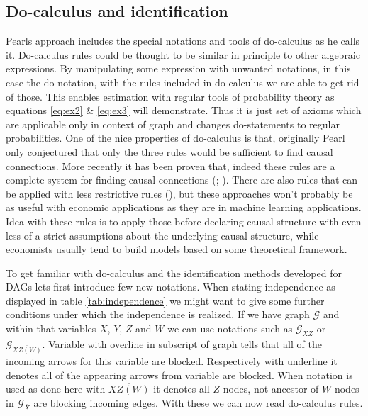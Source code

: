 \documentclass[main=english,12pt,a4paper,pdftex,econ,utf8]{aaltothesis}
\newcommand{\g}{\mathcal{G}}
\begin{document}


\subsection{Do-calculus and identification}

Pearls approach includes the special notations and tools of do-calculus as he calls it. Do-calculus rules could be thought to be similar in principle to other algebraic expressions. By manipulating some expression with unwanted notations, in this case the do-notation, with the rules included in do-calculus we are able to get rid of those. This enables estimation with regular tools of probability theory as equations \ref{eq:ex2} \& \ref{eq:ex3} will demonstrate. Thus it is just set of axioms which are applicable only in context of graph and changes do-statements to regular probabilities. One of the nice properties of do-calculus is that, originally Pearl only conjectured that only the three rules would be sufficient to find causal connections. More recently it has been proven that, indeed these rules are a complete system for finding causal connections (\cite{Shpitser2006}; \cite{Huang2006a}). There are also rules that can be applied with less restrictive rules (\cite{Hyttinen2015}), but these approaches won't probably be as useful with economic applications as they are in machine learning applications. Idea with these rules is to apply those before declaring causal structure with even less of a strict assumptions about the underlying causal structure, while economists usually tend to build models based on some theoretical framework.

To get familiar with do-calculus and the identification methods developed for DAGs lets first introduce few new notations. When stating independence as displayed in table \ref{tab:independence} we might want to give some further conditions under which the independence is realized. If we have graph $\g$ and within that variables $X$, $Y$, $Z$ and $W$ we can use notations such as $\g_{\overline{X}\underline{Z}}$ or $\g_{\overline{XZ(W)}}$. Variable with overline in subscript of graph tells that all of the incoming arrows for this variable are blocked. Respectively with underline it denotes all of the appearing arrows from variable are blocked. When notation is used as done here with $\overline{XZ(W)}$ it denotes all $Z$-nodes, not ancestor of $W$-nodes in $\g_{\overline{X}}$ are blocking incoming edges. With these we can now read do-calculus rules.
\end{document}

